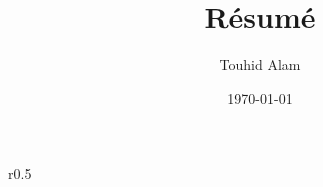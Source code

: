 \documentclass[a4paper, 10pt]{article}
\title{R\'esum\'e}
\author{Touhid Alam}
\date{\today}
\begin{document}
\begin{wrapfigure}{r}{0.5\textwidth}

  
  
  
  
  

\end{wrapfigure}

\end{document}
